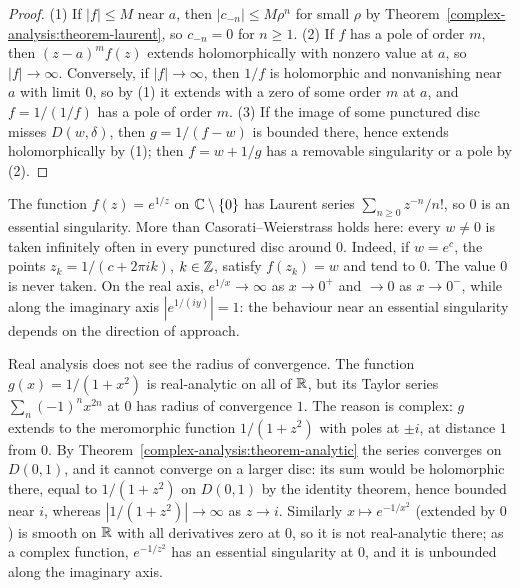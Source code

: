 \begin{proof}
(1) If $|f| \leq M$ near $a$, then $|c_{-n}| \leq M\rho^{n}$ for small $\rho$ by Theorem~\ref{complex-analysis:theorem-laurent}, so $c_{-n} = 0$ for $n \geq 1$. (2) If $f$ has a pole of order $m$, then
$(z - a)^mf(z)$ extends holomorphically with nonzero value at $a$, so $|f| \to \infty$. Conversely, if $|f| \to \infty$, then $1/f$ is holomorphic and nonvanishing near $a$ with limit $0$, so by (1) it extends
with a zero of some order $m$ at $a$, and $f = 1/(1/f)$ has a pole of order $m$. (3) If the image of some punctured disc misses $D(w, \delta)$, then $g = 1/(f - w)$ is bounded there, hence extends
holomorphically by (1); then $f = w + 1/g$ has a removable singularity or a pole by (2).
\end{proof}

\begin{example}\label{complex-analysis:example-essential}
The function $f(z) = e^{1/z}$ on $\mathbb{C} \setminus \{0\}$ has Laurent series $\sum_{n \geq 0}z^{-n}/n!$, so $0$ is an essential singularity. More than Casorati--Weierstrass holds here: every $w \neq 0$ is taken
infinitely often in every punctured disc around $0$. Indeed, if $w = e^c$, the points $z_k = 1/(c + 2\pi ik)$, $k \in \mathbb{Z}$, satisfy $f(z_k) = w$ and tend to $0$. The value $0$ is never taken. On the real axis,
$e^{1/x} \to \infty$ as $x \to 0^+$ and $\to 0$ as $x \to 0^-$, while along the imaginary axis $|e^{1/(iy)}| = 1$: the behaviour near an essential singularity depends on the direction of approach.
\end{example}

\begin{counterexample}\label{complex-analysis:counterexample-real-radius}
Real analysis does not see the radius of convergence. The function $g(x) = 1/(1 + x^2)$ is real-analytic on all of $\mathbb{R}$, but its Taylor series $\sum_n(-1)^nx^{2n}$ at $0$ has radius of convergence $1$. The reason
is complex: $g$ extends to the meromorphic function $1/(1 + z^2)$ with poles at $\pm i$, at distance $1$ from $0$. By Theorem~\ref{complex-analysis:theorem-analytic} the series converges on $D(0, 1)$, and it cannot converge on a
larger disc: its sum would be holomorphic there, equal to $1/(1 + z^2)$ on $D(0, 1)$ by the identity theorem, hence bounded near $i$, whereas $|1/(1 + z^2)| \to \infty$ as $z \to i$. Similarly $x \mapsto e^{-1/x^2}$ (extended by $0$) is smooth on $\mathbb{R}$ with all derivatives zero at $0$, so it is not real-analytic there; as a complex function,
$e^{-1/z^2}$ has an essential singularity at $0$, and it is unbounded along the imaginary axis.
\end{counterexample}

